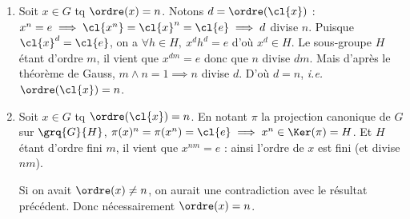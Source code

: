 
\begin{enumerate}

  \item Soit $x\in G$ tq $\ordre(x) = n$.
    Notons $d= \ordre(\cl{x})$ : $x^n = e \implies \cl{x^n}=\cl{x}^n=\cl{e} \implies d$ divise $n$. Puisque $\cl{x}^d = \cl{e}$, on a $\forall h\in H,~ x^d h^d = e$ d'où $x^d \in H$. 
    Le sous-groupe $H$ étant d'ordre $m$, il vient que $x^{dm} = e$ donc que $n$ divise $dm$. 
    Mais d'après le théorème de Gauss, $m\wedge n = 1 \implies n$ divise $d$. D'où $d=n$, \emph{i.e.} $\ordre(\cl{x}) = n$.
 \item Soit $x\in G$ tq $\ordre(\cl{x}) = n$. En notant $\pi$ la projection canonique de $G$ sur $\grq{G}{H}$, $\pi(x)^n = \pi(x^n) = \cl{e} \implies x^n \in \Ker (\pi) = H$. 
 Et $H$ étant d'ordre fini $m$, il vient que $x^{nm} = e$ : ainsi l'ordre de $x$ est fini (et divise $nm$).

 Si on avait $\ordre(x)\neq n$, on aurait une contradiction avec le résultat précédent. Donc nécessairement $\ordre(x) =n$.

\end{enumerate}

